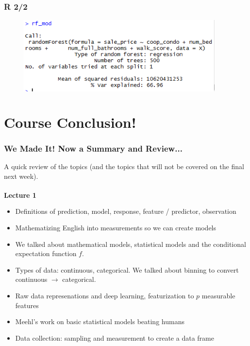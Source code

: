 \documentclass[handout]{beamer}
\begin{document}
\begin{frame}\frametitle{R 2/2}

\begin{figure}
\centering
\includegraphics[width=4.1in]{R01.png}
\end{figure}

\end{frame}

\section{Course Conclusion!}

\begin{frame}\frametitle{We Made It! Now a Summary and Review...}
\small
A quick review of the topics (and the topics that will not be covered on the final next week).\\~\\

\textbf{Lecture 1}

\begin{itemize}
\item Definitions of prediction, model, response, feature / predictor, observation \pause
\item Mathematizing English into measurements so we can create models \pause
\item We talked about mathematical models, statistical models and the conditional expectation function $f$. \pause
\item Types of data: continuous, categorical. We talked about binning to convert continuous $\rightarrow$ categorical. \pause
\item Raw data represenations and deep learning, featurization to $p$ measurable features \pause
\item Meehl's work on basic statistical models beating humans \pause
\item Data collection: sampling and measurement to create a data frame
\end{itemize}

\end{frame}
\end{document}
